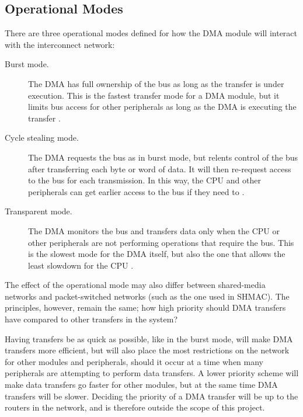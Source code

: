 \subsection{Operational Modes}
There are three operational modes defined for how the DMA module will interact with the interconnect network:
\begin{description}
    \item[Burst mode.] 
    The DMA has full ownership of the bus as long as the transfer is under execution.
    This is the fastest transfer mode for a DMA module, but it limits bus access for other
    peripherals as long as the DMA is executing the transfer \cite{encyclopedia}.

    \item[Cycle stealing mode.] 
    The DMA requests the bus as in burst mode, but relents control of the bus after transferring
    each byte or word of data. It will then re-request access to the bus for each transmission.
    In this way, the CPU and other peripherals can get earlier access to the bus if they need to \cite{encyclopedia}.

    \item[Transparent mode.] 
    The DMA monitors the bus and transfers data only when the CPU or other peripherals are not performing operations that require the bus.
    This is the slowest mode for the DMA itself, but also the one that allows the least slowdown for the CPU \cite{dma-lecture}.
\end{description}

The effect of the operational mode may also differ between shared-media networks and packet-switched networks (such as the one used in SHMAC).
The principles, however, remain the same; how high priority should DMA transfers have compared to other transfers in the system?

Having transfers be as quick as possible, like in the burst mode, will make DMA transfers more efficient, but will also place the most restrictions on the network for other modules and peripherals, should it occur at a time when many peripherals are attempting to perform data transfers.
A lower priority scheme will make data transfers go faster for other modules, but at
the same time DMA transfers will be slower. Deciding the priority of a DMA transfer
will be up to the routers in the network, and is therefore outside the scope of this project.

